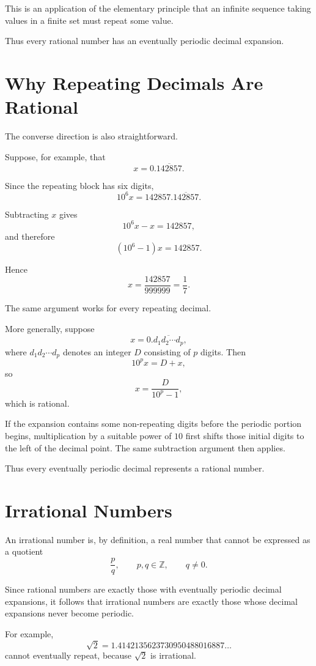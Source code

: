 \documentclass{essay}
\begin{document}
This is an application of the elementary principle that an infinite sequence taking values in a finite set must repeat some value.

Thus every rational number has an eventually periodic decimal expansion.

\section{Why Repeating Decimals Are Rational}

The converse direction is also straightforward.

Suppose, for example, that
\[
x=0.\overline{142857}.
\]

Since the repeating block has six digits,
\[
10^6x
=
142857.\overline{142857}.
\]

Subtracting \(x\) gives
\[
10^6x-x
=
142857,
\]
and therefore
\[
(10^6-1)x
=
142857.
\]

Hence
\[
x
=
\frac{142857}{999999}
=
\frac17.
\]

The same argument works for every repeating decimal.

More generally, suppose
\[
x=0.\overline{d_1d_2\cdots d_p},
\]
where \(d_1d_2\cdots d_p\) denotes an integer \(D\) consisting of \(p\) digits. Then
\[
10^p x=D+x,
\]
so
\[
x=\frac{D}{10^p-1},
\]
which is rational.

If the expansion contains some non-repeating digits before the periodic portion begins, multiplication by a suitable power of \(10\) first shifts those initial digits to the left of the decimal point. The same subtraction argument then applies.

Thus every eventually periodic decimal represents a rational number.

\section{Irrational Numbers}

An irrational number is, by definition, a real number that cannot be expressed as a quotient
\[
\frac{p}{q},
\qquad
p,q\in\mathbb{Z},
\qquad
q\neq 0.
\]

Since rational numbers are exactly those with eventually periodic decimal expansions, it follows that irrational numbers are exactly those whose decimal expansions never become periodic.

For example,
\[
\sqrt{2}
=
1.4142135623730950488016887\ldots
\]
cannot eventually repeat, because \(\sqrt{2}\) is irrational.
\end{document}
